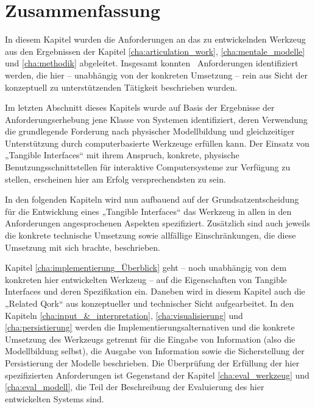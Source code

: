 
\section{Zusammenfassung}
\label{sec:anforderungen_zusammenfassung}

In diesem Kapitel wurden die Anforderungen an das zu entwickelnden Werkzeug aus den Ergebnissen der Kapitel \ref{cha:articulation_work}, \ref{cha:mentale_modelle} und \ref{cha:methodik} abgeleitet. Insgesamt konnten \theanf \ Anforderungen identifiziert werden, die hier -- unabhängig von der konkreten Umsetzung -- rein aus Sicht der konzeptuell zu unterstützenden Tätigkeit beschrieben wurden.

Im letzten Abschnitt dieses Kapitels wurde auf Basis der Ergebnisse der Anforderungserhebung jene Klasse von Systemen identifiziert, deren Verwendung die grundlegende Forderung nach physischer Modellbildung und gleichzeitiger Unterstützung durch computerbasierte Werkzeuge erfüllen kann. Der Einsatz von „Tangible Interfaces“ mit ihrem Anspruch, konkrete, physische Benutzungsschnittstellen für interaktive Computersysteme zur Verfügung zu stellen, erscheinen hier am Erfolg versprechendsten zu sein.

In den folgenden Kapiteln wird nun aufbauend auf der Grundsatzentscheidung für die Entwicklung eines „Tangible Interfaces“ das Werkzeug in allen in den Anforderungen angesprochenen Aspekten spezifiziert. Zusätzlich sind auch jeweils die konkrete technische Umsetzung sowie allfällige Einschränkungen, die diese Umsetzung mit sich brachte, beschrieben.

Kapitel \ref{cha:implementierung_Überblick} geht -- noch unabhängig von dem konkreten hier entwickelten Werkzeug -- auf die Eigenschaften von Tangible Interfaces und deren Spezifikation ein. Daneben wird in diesem Kapitel auch die „Related Qork“ aus konzeptueller und technischer Sicht aufgearbeitet. In den Kapiteln \ref{cha:input_&_interpretation}, \ref{cha:visualisierung} und \ref{cha:persistierung} werden die Implementierungsalternativen und die konkrete Umsetzung des Werkzeugs getrennt für die Eingabe von Information (also die Modellbildung selbst), die Ausgabe von Information sowie die Sicherstellung der Persistierung der Modelle beschrieben. Die Überprüfung der Erfüllung der hier spezifizierten Anforderungen ist Gegenstand der Kapitel \ref{cha:eval_werkzeug} und \ref{cha:eval_modell}, die Teil der Beschreibung der Evaluierung des hier entwickelten Systems sind.

